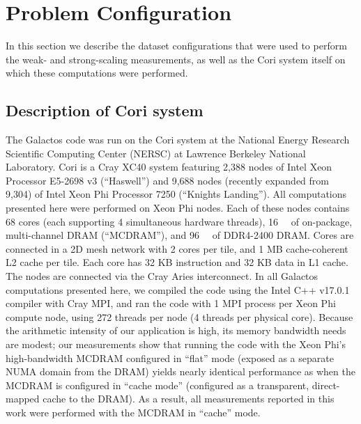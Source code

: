 \section{Problem Configuration}

In this section we describe the dataset configurations that were used to perform the weak- and strong-scaling measurements, as well as the Cori system itself on which these computations were performed.

\subsection{Description of Cori system}
\label{sec:cori}

The Galactos code was run on the Cori system at the National Energy Research Scientific Computing Center (NERSC) at Lawrence Berkeley National Laboratory.
Cori is a Cray XC40 system featuring 2,388 nodes of Intel Xeon Processor E5-2698 v3 (``Haswell'') and 9,688 nodes (recently expanded from 9,304) of Intel Xeon Phi Processor 7250 (``Knights Landing'').
All computations presented here were performed on Xeon Phi nodes.
Each of these nodes contains \num{68} cores (each supporting \num{4} simultaneous hardware threads), \num{16}~\si{\giga\byte} of on-package, multi-channel DRAM (``MCDRAM''), and \num{96}~\si{\giga\byte} of DDR4-2400 DRAM.
Cores are connected in a 2D mesh network with 2 cores per tile, and 1 MB cache-coherent L2 cache per tile. 
Each core has 32 KB instruction and 32 KB data in L1 cache. 
The nodes are connected via the Cray Aries interconnect.
In all Galactos computations presented here, we compiled the code using the Intel C++ v17.0.1 compiler with Cray MPI, and ran the code with 1 MPI process per Xeon Phi compute node, using 272 threads per node (4 threads per physical core).
Because the arithmetic intensity of our application is high, its memory bandwidth needs are modest; our measurements show that running the code with the Xeon Phi's high-bandwidth MCDRAM configured in ``flat'' mode (exposed as a separate NUMA domain from the DRAM) yields nearly identical performance as when the MCDRAM is configured in ``cache mode'' (configured as a transparent, direct-mapped cache to the DRAM).
As a result, all measurements reported in this work were performed with the MCDRAM in ``cache'' mode.




